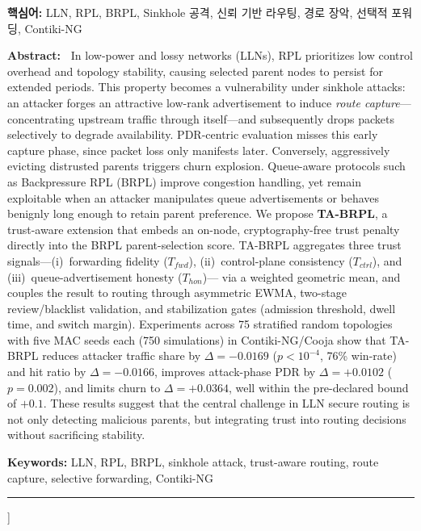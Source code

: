 \documentclass[10pt,a4paper,twocolumn]{article}
\newcommand{\enabstract}[1]{%
  \small\textbf{Abstract:~}#1\par}
\begin{document}
{\begin{center}
\begin{minipage}{0.96\textwidth}
\noindent\textbf{핵심어:}
LLN, RPL, BRPL, Sinkhole 공격, 신뢰 기반 라우팅, 경로 장악, 선택적 포워딩, Contiki-NG
\end{minipage}

\vspace{6pt}

\begin{minipage}{0.96\textwidth}
\enabstract{%
In low-power and lossy networks (LLNs), RPL prioritizes low control overhead and topology
stability, causing selected parent nodes to persist for extended periods.
This property becomes a vulnerability under sinkhole attacks:
an attacker forges an attractive low-rank advertisement to induce
\emph{route capture}---concentrating upstream traffic through itself---and subsequently
drops packets selectively to degrade availability.
PDR-centric evaluation misses this early capture phase, since packet loss only manifests later.
Conversely, aggressively evicting distrusted parents triggers churn explosion.
Queue-aware protocols such as Backpressure RPL (BRPL) improve congestion handling,
yet remain exploitable when an attacker manipulates queue advertisements or behaves benignly
long enough to retain parent preference.
We propose \textbf{TA-BRPL}, a trust-aware extension that embeds an on-node, cryptography-free trust penalty
directly into the BRPL parent-selection score.
TA-BRPL aggregates three trust signals---(i)~forwarding fidelity ($T_{fwd}$),
(ii)~control-plane consistency ($T_{ctrl}$), and (iii)~queue-advertisement honesty ($T_{hon}$)---%
via a weighted geometric mean, and couples the result to routing
through asymmetric EWMA, two-stage review/blacklist validation, and stabilization gates
(admission threshold, dwell time, and switch margin).
Experiments across 75 stratified random topologies with five MAC seeds each
(750 simulations) in Contiki-NG/Cooja show that TA-BRPL reduces attacker traffic share
by $\Delta = -0.0169$ ($p < 10^{-4}$, 76\% win-rate) and hit ratio by $\Delta = -0.0166$,
improves attack-phase PDR by $\Delta = +0.0102$ ($p = 0.002$),
and limits churn to $\Delta = +0.0364$, well within the pre-declared bound of $+0.1$.
These results suggest that the central challenge in LLN secure routing is not only detecting
malicious parents, but integrating trust into routing decisions without sacrificing stability.}
\vspace{4pt}

\noindent\textbf{Keywords:}
LLN, RPL, BRPL, sinkhole attack, trust-aware routing, route capture,
selective forwarding, Contiki-NG
\end{minipage}

\vspace{8pt}\hrule\vspace{10pt}
\end{center}
}]  %
\end{document}
